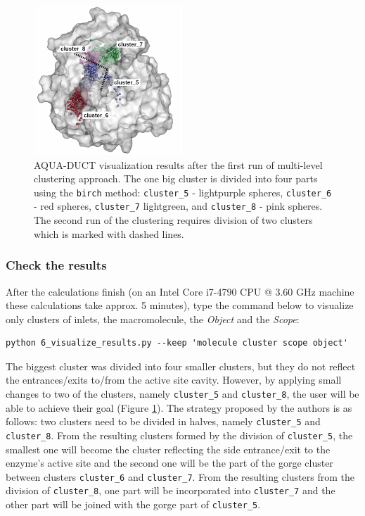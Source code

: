 \documentclass[9pt,tutorial, pubversion]{livecoms}
\begin{document}
\begin{figure}[ht!]
\centering
\includegraphics[width=0.5\textwidth]{Tut2.1.png}
\caption{AQUA-DUCT visualization results after the first run of multi-level clustering approach. The one big cluster is divided into four parts using the \texttt{birch} method: \texttt{cluster\_5} - lightpurple spheres, \texttt{cluster\_6} - red spheres, \texttt{cluster\_7} lightgreen, and \texttt{cluster\_8} - pink spheres. The second run of the clustering requires division of two clusters which is marked with dashed lines.}
\label{Tut2.1}
\end{figure}

\subsubsection{Check the results}
After the calculations finish (on an Intel Core i7-4790 CPU @ 3.60 GHz machine these calculations take approx. 5 minutes), type the command below to visualize only clusters of inlets, the macromolecule, the \emph{Object} and the \emph{Scope}:
\begin{lstlisting}[columns=fullflexible]
python 6_visualize_results.py --keep 'molecule cluster scope object'
\end{lstlisting}

The biggest cluster was divided into four smaller clusters, but they do not reflect the entrances/exits to/from the active site cavity. However, by applying small changes to two of the clusters, namely \texttt{cluster\_5} and \texttt{cluster\_8}, the user will be able to achieve their goal (Figure \ref{Tut2.1}). The strategy proposed by the authors is as follows: two clusters need to be divided in halves, namely \texttt{cluster\_5} and \texttt{cluster\_8}. From the resulting clusters formed by the division of \texttt{cluster\_5}, the smallest one will become the cluster reflecting the side entrance/exit to the enzyme's active site and the second one will be the part of the gorge cluster between clusters \texttt{cluster\_6} and \texttt{cluster\_7}. From the resulting clusters from the division of \texttt{cluster\_8}, one part will be incorporated into \texttt{cluster\_7} and the other part will be joined with the gorge part of \texttt{cluster\_5}. 
\end{document}
